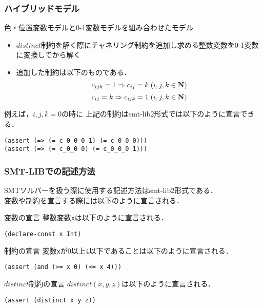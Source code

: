 \documentclass [dvipdfmx,12pt]{beamer}
\newcommand{\distinct}{$distinct$}
\begin{document}
\begin{frame}[fragile]\small
    \frametitle{ハイブリッドモデル}
    色・位置変数モデルと0-1変数モデルを組み合わせたモデル\\
    \setlength{\abovedisplayskip}{1pt} %
    \setlength{\belowdisplayskip}{1pt} %
    \begin{block}{}
        \begin{itemize}
            \item \distinct 制約を解く際にチャネリング制約を追加し求める整数変数を0-1変数に変換してから解く
            \item 追加した制約は以下のものである．
                $$ c_{ijk}=1 \Rightarrow c_{ij}=k \; (i,j,k \in \bf N)$$
                $$ c_{ij}=k \Rightarrow c_{ijk}=1 \; (i,j,k \in \bf N)$$
        \end{itemize}
    \end{block}
    例えば，$i,j,k=0$の時に
    上記の制約はsmt-lib2形式では以下のように宣言できる．
    \begin{exampleblock}{}
\begin{verbatim}
(assert (=> (= c_0_0_0 1) (= c_0_0 0)))
(assert (=> (= c_0_0 0) (= c_0_0_0 1)))
\end{verbatim}
    \end{exampleblock}
\end{frame}


\begin{frame}[fragile]\small
    \frametitle{SMT-LIBでの記述方法}
    SMTソルバーを扱う際に使用する記述方法はsmt-lib2形式である．\\
    変数や制約を宣言する際には以下のように宣言される．
    \begin{exampleblock}{変数の宣言}
        整数変数\verb|x|は以下のように宣言される．
\begin{verbatim}
(declare-const x Int)
\end{verbatim}
    \end{exampleblock}
    \begin{exampleblock}{制約の宣言}
        変数\verb|x|が0以上4以下であることは以下のように宣言される．
\begin{verbatim}
(assert (and (>= x 0) (<= x 4)))
\end{verbatim}
    \end{exampleblock}
    \begin{exampleblock}{\distinct 制約の宣言}
        $distinct(x,y,z)$は以下のように宣言される．
\begin{verbatim}
(assert (distinct x y z))
\end{verbatim}
    \end{exampleblock}
\end{frame}
\end{document}
